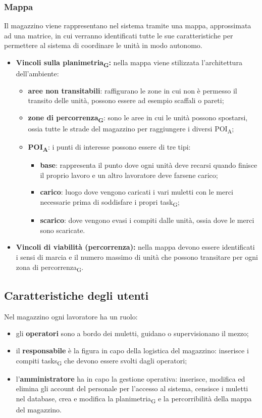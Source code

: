 \subsubsection{Mappa}
Il magazzino viene rappresentano nel sistema tramite una mappa, approssimata ad una matrice, in cui verranno identificati tutte le sue caratteristiche per permettere al sistema di coordinare le unità in modo autonomo.
\begin{itemize}
	\item \textbf{Vincoli sulla \gls{planimetria}\textsubscript{G}:} nella mappa viene stilizzata l'architettura dell'ambiente:
	\begin{itemize}
		\item \textbf{aree non transitabili}: raffigurano le zone in cui non è permesso il transito delle unità, possono essere ad esempio scaffali o pareti;
		\item \textbf{zone di \gls{percorrenza}\textsubscript{G}}: sono le aree in cui le unità possono spostarsi, ossia tutte le strade del magazzino per raggiungere i diversi \acrshort{POI}\textsubscript{A};
		\item \textbf{\acrshort{POI}\textsubscript{A}}: i punti di interesse possono essere di tre tipi:
		\begin{itemize}
			\item \textbf{base}: rappresenta il punto dove ogni unità deve recarsi quando finisce il proprio lavoro e un altro lavoratore deve farsene carico;
			\item \textbf{carico}: luogo dove vengono caricati i vari muletti con le merci necessarie prima di soddisfare i propri \gls{task}\textsubscript{G};
			\item \textbf{scarico}: dove vengono evasi i compiti dalle unità, ossia dove le merci sono scaricate.
		\end{itemize}
	\end{itemize}
	\item \textbf{Vincoli di viabilità (percorrenza):} nella mappa devono essere identificati i sensi di marcia e il numero massimo di unità che possono transitare per ogni zona di \gls{percorrenza}\textsubscript{G}.
	
\end{itemize}

\subsection{Caratteristiche degli utenti}
Nel magazzino ogni lavoratore ha un ruolo: 
\begin{itemize}
	\item gli \textbf{operatori} sono a bordo dei muletti, guidano o supervisionano il mezzo;
	\item il \textbf{responsabile} è la figura in capo della logistica del magazzino: inserisce i compiti \glspl{task}\textsubscript{G} che devono essere svolti dagli operatori; 
	\item l'\textbf{amministratore} ha in capo la gestione operativa: inserisce, modifica ed elimina gli account del personale per l'accesso al sistema, censisce i muletti nel database, crea e modifica la \gls{planimetria}\textsubscript{G} e la percorribilità della mappa del magazzino.
\end{itemize}
